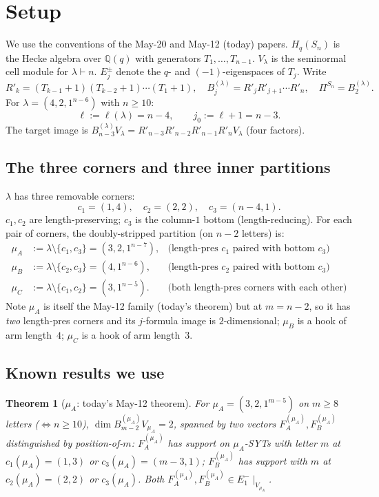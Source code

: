 \documentclass[11pt]{article}
\newtheorem{theorem}{Theorem}
\theoremstyle{definition}
\begin{document}
\section{Setup}\label{sec:setup}

We use the conventions of the May-20 and May-12 (today) papers.
$H_q(S_n)$ is the Hecke algebra over $\mathbb{Q}(q)$ with generators
$T_1, \ldots, T_{n-1}$. $V_\lambda$ is the seminormal cell module
for $\lambda \vdash n$. $E_j^\pm$ denote the $q$- and
$(-1)$-eigenspaces of $T_j$. Write
\[
   R'_k = (T_{k-1}{+}1)(T_{k-2}{+}1)\cdots(T_1{+}1),
   \quad
   B_j^{(\lambda)} = R'_j R'_{j+1} \cdots R'_n,
   \quad
   \Pi^{S_n} = B_2^{(\lambda)}.
\]
For $\lambda = (4, 2, 1^{n-6})$ with $n \ge 10$:
\[
   \ell := \ell(\lambda) = n - 4,
   \qquad
   j_0 := \ell + 1 = n - 3.
\]
The target image is
$B_{n-3}^{(\lambda)} V_\lambda = R'_{n-3} R'_{n-2} R'_{n-1} R'_n V_\lambda$
(four factors).

\subsection{The three corners and three inner partitions}

$\lambda$ has three removable corners:
\[
   c_1 = (1, 4), \quad c_2 = (2, 2), \quad c_3 = (n-4, 1).
\]
$c_1, c_2$ are length-preserving; $c_3$ is the column-$1$ bottom
(length-reducing). For each pair of corners, the doubly-stripped
partition (on $n - 2$ letters) is:
\begin{align*}
   \mu_A &:= \lambda \setminus \{c_1, c_3\} = (3, 2, 1^{n-7}),
      &\text{(length-pres $c_1$ paired with bottom $c_3$)} \\
   \mu_B &:= \lambda \setminus \{c_2, c_3\} = (4, 1^{n-6}),
      &\text{(length-pres $c_2$ paired with bottom $c_3$)} \\
   \mu_C &:= \lambda \setminus \{c_1, c_2\} = (3, 1^{n-5}).
      &\text{(both length-pres corners with each other)}
\end{align*}
Note $\mu_A$ is itself the May-12 family (today's theorem) but at
$m = n - 2$, so it has \emph{two} length-pres corners and its
$j$-formula image is $2$-dimensional; $\mu_B$ is a hook of arm
length~$4$; $\mu_C$ is a hook of arm length~$3$.

\subsection{Known results we use}

\begin{theorem}[$\mu_A$: today's May-12 theorem]\label{thm:muA}
For $\mu_A = (3, 2, 1^{m-5})$ on $m \ge 8$ letters
($\Leftrightarrow n \ge 10$), $\dim B_{m-2}^{(\mu_A)} V_{\mu_A} = 2$,
spanned by two vectors $F_A^{(\mu_A)}, F_B^{(\mu_A)}$
distinguished by position-of-$m$:
$F_A^{(\mu_A)}$ has support on $\mu_A$-SYTs with letter $m$ at
$c_1(\mu_A) = (1, 3)$ or $c_3(\mu_A) = (m-3, 1)$;
$F_B^{(\mu_A)}$ has support with $m$ at $c_2(\mu_A) = (2, 2)$ or
$c_3(\mu_A)$. Both $F_A^{(\mu_A)}, F_B^{(\mu_A)} \in
E_1^-\!\mid_{V_{\mu_A}}$.
\end{theorem}
\end{document}
